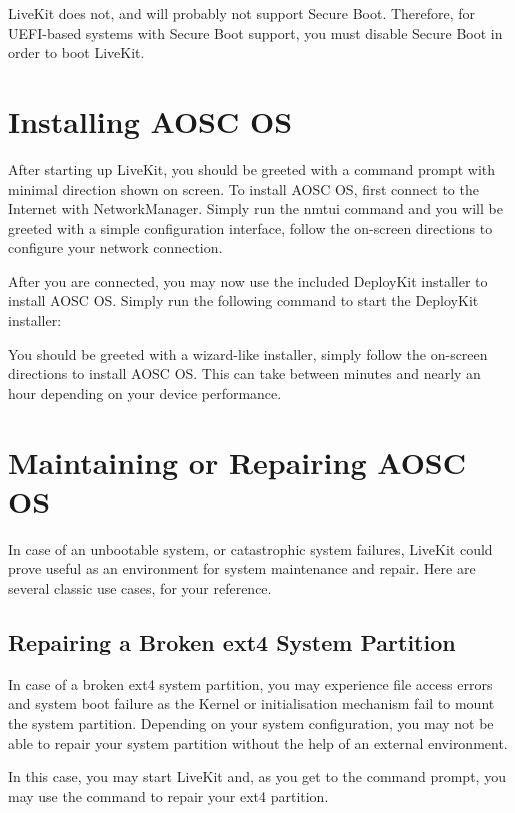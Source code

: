     LiveKit does not, and will probably not support Secure Boot.
    Therefore, for UEFI-based systems with Secure Boot support,
    you must disable Secure Boot in order to boot LiveKit.

    \section{Installing AOSC OS}
    
    After starting up LiveKit, you should be greeted with a command prompt with minimal direction shown on screen. To install AOSC OS, first connect to the Internet with NetworkManager. Simply run the nmtui command and you will be greeted with a simple configuration interface, follow the on-screen directions to configure your network connection.

    After you are connected, you may now use the included DeployKit installer to install AOSC OS. Simply run the following command to start the DeployKit installer:


    You should be greeted with a wizard-like installer, simply follow the on-screen directions to install AOSC OS. This can take between minutes and nearly an hour depending on your device performance.
    
    
    \section{Maintaining or Repairing AOSC OS}

    In case of an unbootable system, or catastrophic system failures, LiveKit could prove useful as an environment for system maintenance and repair. Here are several classic use cases, for your reference.

    \subsection{Repairing a Broken ext4 System Partition}

    In case of a broken ext4 system partition, you may experience file access errors and system boot failure
    as the Kernel or initialisation mechanism fail to mount the system partition.
    Depending on your system configuration, you may not be able to repair your system partition
    without the help of an external environment.

    In this case, you may start LiveKit and, as you get to the command prompt,
    you may use the  command to repair your ext4 partition.

